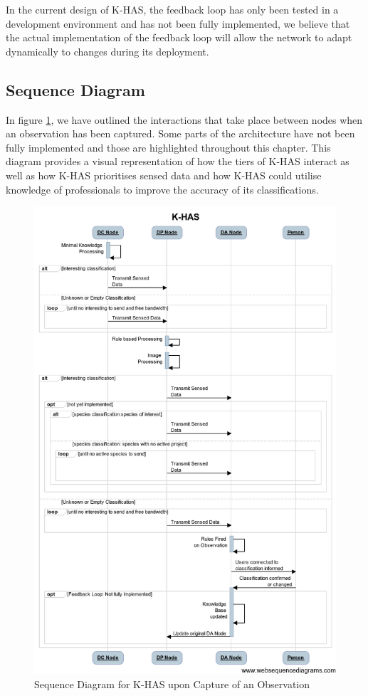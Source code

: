 	In the current design of K-HAS, the feedback loop has only been tested in a development environment and has not been fully implemented, we believe that the actual implementation of the feedback loop will allow the network to adapt dynamically to changes during its deployment.

	\subsection{Sequence Diagram}
	In figure \ref{arch:seq}, we have outlined the interactions that take place between nodes when an observation has been captured. Some parts of the architecture have not been fully implemented and those are highlighted throughout this chapter. This diagram provides a visual representation of how the tiers of K-HAS interact as well as how K-HAS prioritises sensed data and how K-HAS could utilise knowledge of professionals to improve the accuracy of its classifications.

	\begin{figure}
    \centering
      \includegraphics[width=\textwidth]{Chap4/figures/sd.png}
    \caption{Sequence Diagram for K-HAS upon Capture of an Observation}
    \label{arch:seq}
    \end{figure}
	
